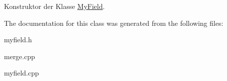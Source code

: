 Konstruktor der Klasse \hyperlink{class_my_field}{My\-Field}. 



The documentation for this class was generated from the following files\-:\begin{DoxyCompactItemize}
\item 
myfield.\-h\item 
merge.\-cpp\item 
myfield.\-cpp\end{DoxyCompactItemize}
